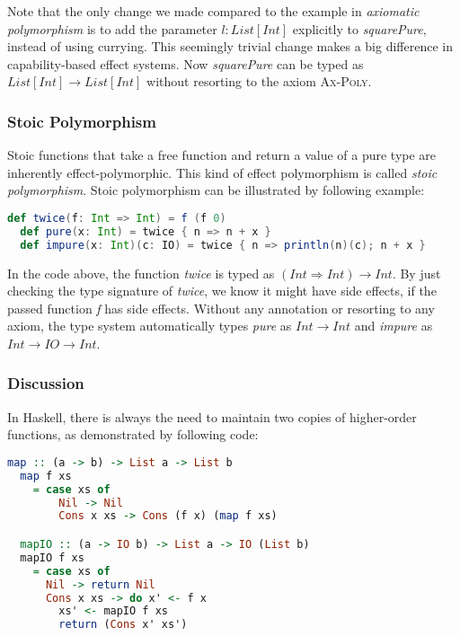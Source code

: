 Note that the only change we made compared to the example in
\emph{axiomatic polymorphism} is to add the parameter $l: List[Int]$
explicitly to \emph{squarePure}, instead of using currying. This
seemingly trivial change makes a big difference in capability-based
effect systems. Now \emph{squarePure} can be typed as
$List[Int] \to List[Int]$ without resorting to the axiom
\textsc{Ax-Poly}.

\subsubsection{Stoic Polymorphism}

Stoic functions that take a free function and return a value of a pure
type are inherently effect-polymorphic. This kind of effect
polymorphism is called \emph{stoic polymorphism}.  Stoic polymorphism
can be illustrated by following example:

\begin{lstlisting}[language=Scala]
  def twice(f: Int => Int) = f (f 0)
  def pure(x: Int) = twice { n => n + x }
  def impure(x: Int)(c: IO) = twice { n => println(n)(c); n + x }
\end{lstlisting}

In the code above, the function \emph{twice} is typed as
$(Int \Rightarrow Int) \to Int$. By just checking the type signature
of \emph{twice}, we know it might have side effects, if the passed
function \emph{f} has side effects. Without any annotation or
resorting to any axiom, the type system automatically types
\emph{pure} as $Int \to Int$ and \emph{impure} as
$Int \to IO \to Int$.

\subsubsection{Discussion}

In Haskell, there is always the need to maintain two copies of
higher-order functions, as demonstrated by following code:

\begin{lstlisting}[language=Haskell]
  map :: (a -> b) -> List a -> List b
  map f xs
    = case xs of
        Nil -> Nil
        Cons x xs -> Cons (f x) (map f xs)

  mapIO :: (a -> IO b) -> List a -> IO (List b)
  mapIO f xs
    = case xs of
      Nil -> return Nil
      Cons x xs -> do x' <- f x
        xs' <- mapIO f xs
        return (Cons x' xs')
\end{lstlisting}

